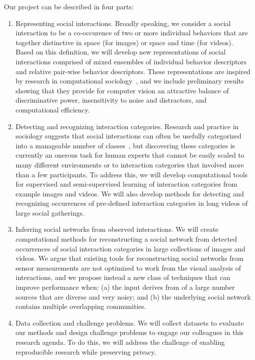 Our project can be described in four parts:
\begin{enumerate}

\item Representing social interactions. Broadly speaking, we consider a social interaction to be a co-occurence of two or more individual behaviors that are together distinctive in space (for images) or space and time (for videos). Based on this definition, we will develop new representations of social interactions comprised of mixed ensembles of individual behavior descriptors and relative pair-wise behavior descriptors. These representations are inspired by research in computational sociology~\cite{}, and we include preliminary results showing that they provide for computer vision an attractive balance of discriminative power, insensitivity to noise and distractors, and computational efficiency.

\item Detecting and recognizing interaction categories. Research and practice in sociology suggests that social interactions can often be usefully categorized into a manageable number of classes~\cite{}, but discovering these categories is currently an onerous task for human experts that cannot be easily scaled to many different environments or to interaction categories that involved more than a few participants. To address this, we will develop computational tools for supervised and semi-supervised learning of interaction categories from example images and videos. We will also develop methods for detecting and recognizing occurrences of pre-defined interaction categories in long videos of large social gatherings.

\item Inferring social networks from observed interactions. We will create computational methods for reconstructing a social network from detected occurrences of social interaction categories in large collections of images and videos. We argue that existing tools for reconstructing social networks from sensor measurements are not optimized to work from the visual analysis of interactions, and we propose instead a new class of techniques that can improve performance when: (a) the input derives from of a large number sources that are diverse and very noisy; and (b) the underlying social network contains multiple overlapping communities. 

\item Data collection and challenge problems. We will collect datasets to evaluate our methods and design challenge problems to engage our colleagues in this research agenda. To do this, we will address the challenge of enabling reproducible research while preserving privacy.

\end{enumerate}

